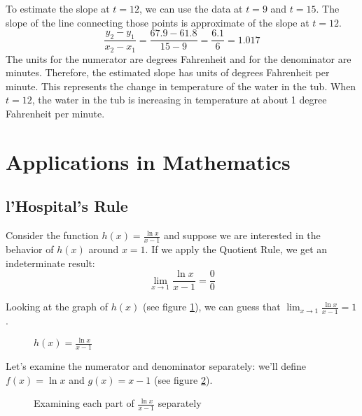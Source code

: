 \begin{Answer}[ref=slope1]
	To estimate the slope at $t = 12$, we can use the data at $t = 9$ and $t = 
	15$. The slope of the line connecting those points is approximate of the 
	slope at $t = 12$. $$\frac{y_2 - y_1}{x_2 - x_1} = \frac{67.9 - 61.8}{15 - 9} 
	= \frac{6.1}{6} = 1.017$$ The units for the numerator are degrees Fahrenheit 
	and for the denominator are minutes. Therefore, the estimated slope has units 
	of degrees Fahrenheit per minute. This represents the change in temperature 
	of the water in the tub. When $t = 12$, the water in the tub is increasing in 
	temperature at about 1 degree Fahrenheit per minute. 
\end{Answer}

\section{Applications in Mathematics}
\subsection{l'Hospital's Rule}
Consider the function $h(x) = \frac{\ln{x}}{x-1}$ and suppose we are interested 
in the behavior of $h(x)$ around $x=1$. If we apply the Quotient Rule, we get 
an indeterminate result: $$\lim_{x \to 1}\frac{\ln{x}}{x-1} = \frac{0}{0}$$ 

Looking at the graph of $h(x)$ (see figure \ref{fig:lhospital}), we can guess 
that $\lim_{x \to 1} \frac{\ln{x}}{x-1} = 1$. 

\begin{figure}[htbp]
\centering
{}
\caption{$h(x) = \frac{\ln{x}}{x - 1}$}
\label{fig:lhospital}
\end{figure}

Let's examine the numerator and denominator separately: we'll define $f(x) = 
\ln{x}$ and $g(x) = x - 1$ (see figure \ref{fig:zoom1}). 

\begin{figure}[htbp]
\centering
{}
\caption{Examining each part of $\frac{\ln{x}}{x-1}$ separately}
\label{fig:zoom1}
\end{figure}

